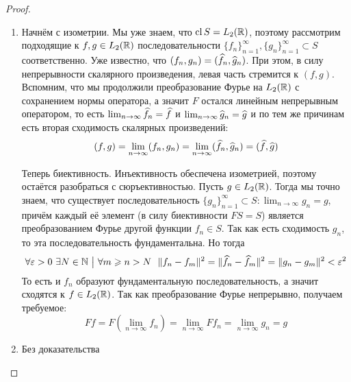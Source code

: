 \begin{proof}~
	\begin{enumerate}
		\item Начнём с изометрии. Мы уже знаем, что $\operatorname{cl} S = L_2(\mathbb{R})$, поэтому рассмотрим подходящие к $f, g \in L_2(\mathbb{R})$ последовательности $\{f_n\}_{n = 1}^\infty, \{g_n\}_{n = 1}^\infty \subset S$ соответственно. Уже известно, что $(f_n, g_n) = (\widehat{f}_n, \widehat{g}_n)$. При этом, в силу непрерывности скалярного произведения, левая часть стремится к $(f, g)$. Вспомним, что мы продолжили преобразование Фурье на $L_2(\mathbb{R})$ с сохранением нормы оператора, а значит $F$ остался линейным непрерывным оператором, то есть $\lim_{n \to \infty} \widehat{f}_n = \widehat{f}$ и $\lim_{n \to \infty} \widehat{g}_n = \widehat{g}$ и по тем же причинам есть вторая сходимость скалярных произведений:
		\[
			(f, g) = \lim_{n \to \infty} (f_n, g_n) = \lim_{n \to \infty} (\widehat{f}_n, \widehat{g}_n) = (\widehat{f}, \widehat{g})
		\]
		
		Теперь биективность. Инъективность обеспечена изометрией, поэтому остаётся разобраться с сюръективностью. Пусть $g \in L_2(\mathbb{R})$. Тогда мы точно знаем, что существует последовательность $\{g_n\}_{n = 1}^\infty \subset S \colon \lim_{n \to \infty} g_n = g$, причём каждый её элемент (в силу биективности $FS = S$) является преобразованием Фурье другой функции $f_n \in S$. Так как есть сходимость $g_n$, то эта последовательность фундаментальна. Но тогда
		\[
			\forall \varepsilon > 0\ \exists N \in \mathbb{N} \ \big|\  \forall m \geqslant n > N\ \ \|f_n - f_m\|^2 = \|\widehat{f}_n - \widehat{f}_m\|^2 = \|g_n - g_m\|^2 < \varepsilon^2
		\]
		То есть и $f_n$ образуют фундаментальную последовательность, а значит сходятся к $f \in L_2(\mathbb{R})$. Так как преобразование Фурье непрерывно, получаем требуемое:
		\[
			Ff = F(\lim_{n \to \infty} f_n) = \lim_{n \to \infty} Ff_n = \lim_{n \to \infty} g_n = g
		\]
		
		\item Без доказательства
	\end{enumerate}
\end{proof}